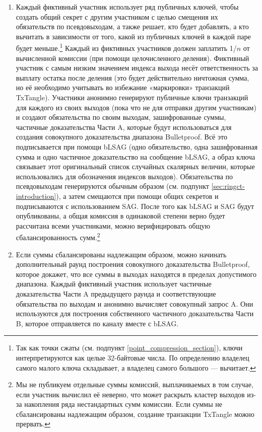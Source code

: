 \begin{enumerate}
    \item Каждый фиктивный участник использует ряд публичных ключей, чтобы создать общий секрет с другим участником с целью смещения их обязательств по псевдовыходам, а также решает, кто будет добавлять, а кто вычитать в зависимости от того, какой из публичных ключей в каждой паре будет меньше.\footnote{Так как точки сжаты (см. подпункт \ref{point_compression_section}), ключи интерпретируются как целые 32-байтовые числа. По определению владелец самого малого ключа складывает, а владелец самого большого — вычитает.} Каждый из фиктивных участников должен заплатить 1/$n$ от вычисленной комиссии (при помощи целочисленного деления). Фиктивный участник с самым низким значением индекса выхода несёт ответственность за выплату остатка после деления (это будет действительно ничтожная сумма, но её необходимо учитывать во избежание «маркировки» транзакций TxTangle). Участники анонимно генерируют публичные ключи транзакций для каждого из своих выходов (пока что не для отправки другим участникам) и создают обязательства по своим выходам, зашифрованные суммы, частичные доказательства Части A, которые будут использоваться для создания совокупного доказательства диапазона Bulletproof. Всё это подписывается при помощи bLSAG (одно обязательство, одна зашифрованная сумма и одно частичное доказательство на сообщение bLSAG, а образ ключа связывает этот оригинальный список случайных скалярных величин, которые использовались для обо\-значения индексов выходов). Обязательства по псевдовыходам генерируются обычным образом (см. подпункт \ref{sec:ringct-introduction}), а затем смещаются при помощи общих секретов и подписы\-ваются с использованием SAG. После того как bLSAG и SAG будут опубликованы, а общая комиссия в одинаковой степени верно будет рассчитана всеми участниками, можно верифицировать общую сбалансированность сумм.\footnote{Мы не публикуем отдельные суммы комиссий, выплачиваемых в том случае, если участник вычислил её неверно, что может раскрыть кластер выходов из-за накопления ряда нестандартных сумм комиссии. Если суммы не сбалансированы надлежащим образом, создание транзакции TxTangle можно прервать.}
    \item Если суммы сбалансированы надлежащим образом, можно начинать дополнительный раунд построения совокупного доказательства Bulletproof, которое докажет, что все суммы в выходах находятся в пределах допустимого диапазона. Каждый фиктивный участник использует частичные доказательства Части A предыдущего раунда и соответ\-ствующие обязательства по выходам и анонимно вычисляет совокупный запрос A. Они используются для построения собственного частичного доказательства Части B, которое отправляется по каналу вместе с bLSAG.

\end{enumerate}
